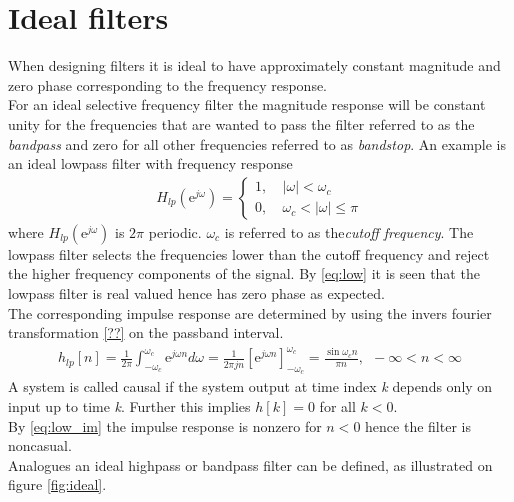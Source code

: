 \section{Ideal filters} 
When designing filters it is ideal to have approximately constant magnitude and zero phase corresponding to the frequency response. \\ For an ideal selective frequency filter the magnitude response will be constant unity for the frequencies that are wanted to pass the filter referred to as the \textit{bandpass} and zero for all other frequencies referred to as \textit{bandstop}. An example is an ideal lowpass filter with frequency response 
\begin{align}\label{eq:low}
H_{lp}(\text{e}^{j\omega})=
\left\{ \begin{matrix}
1, &\ \left| \omega \right|< \omega_c \\
0, &\ \omega_c < \left| \omega \right| \leq \pi
\end{matrix}\right.
\end{align}     
where $H_{lp}(\text{e}^{j\omega})$ is $2\pi$ periodic. $\omega_c$ is referred to as the\textit{cutoff frequency}. The lowpass filter selects the frequencies lower than the cutoff frequency and reject the higher frequency components of the signal. By \eqref{eq:low} it is seen that the lowpass filter is real valued hence has zero phase as expected. \\
The corresponding impulse response are determined by using the invers fourier transformation \eqref{??} on the passband interval.
\begin{align}\label{eq:low_im}
h_{lp}[n]=\frac{1}{2\pi}\int_{-\omega_c}^{\omega_c}\text{e}^{j\omega n} d\omega = \frac{1}{2\pi j n}\left[\text{e}^{j\omega n} \right]_{-\omega_c}^{\omega_c} = \frac{\sin \omega_c n}{\pi n }, \ \  -\infty < n < \infty
\end{align}  
A system is called causal if the system output at time index \textit{k} depends only on input up to time \textit{k}. Further this implies $h[k] = 0$ for all $k<0$.\cite{FSP,p.196 & 208}  \\
By \eqref{eq:low_im} the impulse response is nonzero for $n<0$ hence the filter is noncasual.\\
Analogues an ideal highpass or bandpass filter can be defined, as illustrated on figure \ref{fig:ideal}.\\ 

